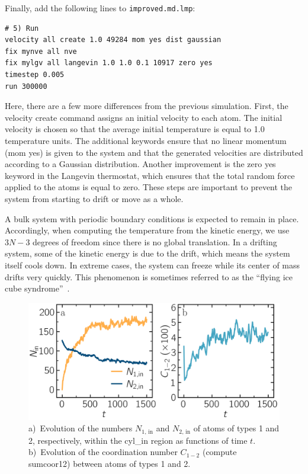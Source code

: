 \documentclass[9pt,tutorial]{livecoms}
\newcommand{\lmpcmd}[1]{\hspace{0pt}\colorbox{listing}{\textcolor{command}{\small{#1}}}\hspace{0pt}} %
\newcommand{\flecmd}[1]{\textcolor{command}{\texttt{#1}}} %
\begin{document}
Finally, add the following lines to \flecmd{improved.md.lmp}:
\begin{lstlisting}
# 5) Run
velocity all create 1.0 49284 mom yes dist gaussian
fix mynve all nve
fix mylgv all langevin 1.0 1.0 0.1 10917 zero yes
timestep 0.005
run 300000
\end{lstlisting}
Here, there are a few more differences from the previous simulation.
First, the \lmpcmd{velocity create} command assigns an initial velocity
to each atom.  The initial velocity is chosen so that the average
initial temperature is equal to 1.0 temperature units.  The additional
keywords ensure that no linear momentum (\lmpcmd{mom yes}) is given to
the system and that the generated velocities are distributed according
to a Gaussian distribution.  Another improvement is the \lmpcmd{zero
  yes} keyword in the Langevin thermostat, which ensures that the total
random force applied to the atoms is equal to zero. These steps are
important to prevent the system from starting to drift or move as a
whole.

\begin{note}
  A bulk system with periodic boundary conditions is expected to remain
  in place.  Accordingly, when computing the temperature from the
  kinetic energy, we use $3N-3$ degrees of freedom since there is no
  global translation.  In a drifting system, some of the kinetic energy
  is due to the drift, which means the system itself cools down.  In
  extreme cases, the system can freeze while its center of mass drifts
  very quickly.  This phenomenon is sometimes referred to as the
  ``flying ice cube syndrome''~\cite{wong2016good}.
\end{note}

\begin{figure}
\centering
\includegraphics[width=\linewidth]{LJ-mixing}
\caption{a)~Evolution of the numbers $N_\text{1, in}$ and $N_\text{2, in}$ of atoms
of types 1 and 2, respectively, within the \lmpcmd{cyl\_in} region as functions
of time $t$.  b)~Evolution of the coordination number $C_{1-2}$ (compute \lmpcmd{sumcoor12})
between atoms of types 1 and 2.}
\label{fig:mixing}
\end{figure}
\end{document}
